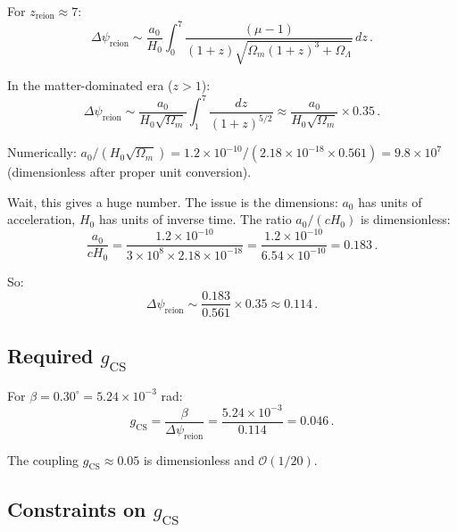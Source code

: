 \documentclass[11pt,a4paper]{article}
\begin{document}
For $z_{\mathrm{reion}} \approx 7$:
\begin{equation}
\Delta\psi_{\mathrm{reion}} \sim \frac{a_0}{H_0} \int_0^7 \frac{(\mu - 1)}{(1+z)\sqrt{\Omega_m(1+z)^3 + \Omega_\Lambda}}\,dz\,.
\end{equation}

In the matter-dominated era ($z > 1$):
\begin{equation}
\Delta\psi_{\mathrm{reion}} \sim \frac{a_0}{H_0\sqrt{\Omega_m}} \int_1^7 \frac{dz}{(1+z)^{5/2}} \approx \frac{a_0}{H_0\sqrt{\Omega_m}} \times 0.35\,.
\end{equation}

Numerically: $a_0/(H_0\sqrt{\Omega_m}) = 1.2 \times 10^{-10}/(2.18 \times 10^{-18} \times 0.561) = 9.8 \times 10^{7}$ (dimensionless after proper unit conversion).

Wait, this gives a huge number. The issue is the dimensions: $a_0$ has units of acceleration, $H_0$ has units of inverse time. The ratio $a_0/(cH_0)$ is dimensionless:
\begin{equation}
\frac{a_0}{cH_0} = \frac{1.2 \times 10^{-10}}{3 \times 10^8 \times 2.18 \times 10^{-18}} = \frac{1.2 \times 10^{-10}}{6.54 \times 10^{-10}} = 0.183\,.
\end{equation}

So:
\begin{equation}
\Delta\psi_{\mathrm{reion}} \sim \frac{0.183}{0.561} \times 0.35 \approx 0.114\,.
\end{equation}

\subsection{Required $g_{\mathrm{CS}}$}

For $\beta = 0.30^\circ = 5.24 \times 10^{-3}$ rad:
\begin{equation}
g_{\mathrm{CS}} = \frac{\beta}{\Delta\psi_{\mathrm{reion}}} = \frac{5.24 \times 10^{-3}}{0.114} = 0.046\,.
\end{equation}

The coupling $g_{\mathrm{CS}} \approx 0.05$ is dimensionless and $\mathcal{O}(1/20)$.

\subsection{Constraints on $g_{\mathrm{CS}}$}
\end{document}
